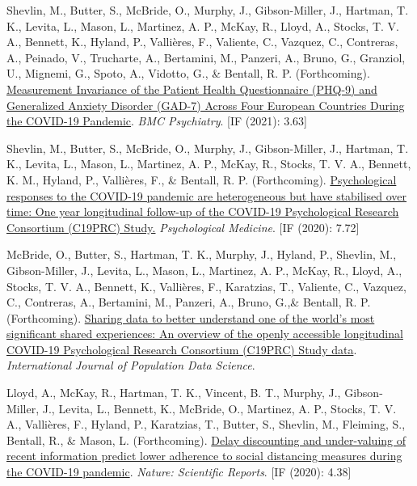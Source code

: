 \documentclass[12pt]{article}
\begin{document}
\begin{bibenum}
\item Shevlin, M., Butter, S., McBride, O., Murphy, J., Gibson-Miller, J., Hartman, T. K., Levita, L., Mason, L., Martinez, A. P., McKay, R., Lloyd, A., Stocks, T. V. A., Bennett, K., Hyland, P., Vallières, F., Valiente, C., Vazquez, C., Contreras, A., Peinado, V., Trucharte, A., Bertamini, M., Panzeri, A., Bruno, G., Granziol, U., Mignemi, G., Spoto, A., Vidotto, G., \& Bentall, R. P. (Forthcoming). \href{https://psyarxiv.com/fwga8/}{Measurement Invariance of the Patient Health Questionnaire (PHQ-9) and Generalized Anxiety Disorder (GAD-7) Across Four European Countries During the COVID-19 Pandemic}. 
	\emph{BMC Psychiatry}. [IF (2021): 3.63]


	\item Shevlin, M., Butter, S., McBride, O., Murphy, J., Gibson-Miller, J., Hartman, T. K.,
	Levita, L., Mason, L., Martinez, A. P.,  
	McKay, R., Stocks, T. V. A., Bennett, K. M.,  Hyland, P., Vallières, F., \& Bentall, R. P. (Forthcoming). 
		\href{https://psyarxiv.com/42dfu/}
		{Psychological responses to the COVID-19 pandemic are heterogeneous but have stabilised over time: 
		One year longitudinal follow-up of the COVID-19 Psychological Research Consortium (C19PRC) Study.}
		\emph{Psychological Medicine}. [IF (2020): 7.72]
		
\item McBride, O., Butter, S., Hartman, T. K., Murphy, J., Hyland, P., Shevlin, M., Gibson-Miller, J.,  Levita, L., Mason, L., Martinez, A. P., McKay, R., Lloyd, A., Stocks, T. V. A., Bennett, K., Vallières, F., Karatzias, T., Valiente, C., Vazquez, C., Contreras, A., Bertamini, M., Panzeri, A., Bruno, G.,\& Bentall, R. P. (Forthcoming). \href{}{Sharing data to better understand one of the world’s most significant shared experiences: An overview of the openly accessible longitudinal COVID-19 Psychological Research Consortium (C19PRC) Study data}. 
	\emph{International Journal of Population Data Science}.

	\item Lloyd, A., McKay, R., Hartman, T. K., Vincent, B. T., Murphy, J., Gibson- Miller, J., Levita, L., 
	Bennett, K., McBride, O.,  Martinez, A. P., Stocks, T. V. A., Vallières, F., Hyland, P., Karatzias, T., 
	Butter, S., Shevlin, M., Fleiming, S., Bentall, R., \& Mason, L.  (Forthcoming). 
		\href{https://psyarxiv.com/kvynr/}
		{Delay discounting and under-valuing of recent information predict lower adherence 
		to social distancing measures during the COVID-19 	pandemic}.
		\emph{Nature: Scientific Reports}. [IF (2020): 4.38]
		


\end{bibenum}
\end{document}
